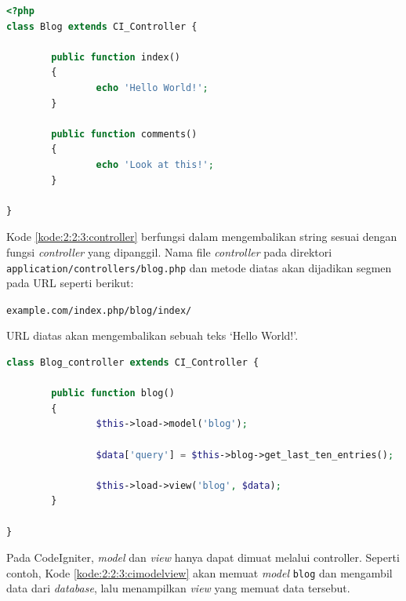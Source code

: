 \documentclass[a4paper,twoside]{article}
\begin{document}
\begin{enumerate}
\begin{itemize}
\begin{enumerate}
			                  \begin{lstlisting}[language=php, caption={Contoh \textit{controller}}, label={kode:2:2:3:controller}]
<?php
class Blog extends CI_Controller {

		public function index()
		{
				echo 'Hello World!';
		}

		public function comments()
		{
				echo 'Look at this!';
		}

}
\end{lstlisting}

			                  Kode \ref{kode:2:2:3:controller} berfungsi dalam mengembalikan string sesuai dengan fungsi \textit{controller} yang dipanggil. Nama file \textit{controller} pada direktori \verb|application/controllers/blog.php| dan metode diatas akan dijadikan segmen pada URL seperti berikut:

			                  \vspace{0.25cm}
			                  \begin{center}
				                  \verb|example.com/index.php/blog/index/|
			                  \end{center}
			                  \vspace{0.25cm}

			                  URL diatas akan mengembalikan sebuah teks `Hello World!'.

			                  \begin{lstlisting}[language=php, caption=Contoh memuat \textit{model} dan menampilkan \textit{view}, label=kode:2:2:3:cimodelview]
class Blog_controller extends CI_Controller {

		public function blog()
		{
				$this->load->model('blog');

				$data['query'] = $this->blog->get_last_ten_entries();

				$this->load->view('blog', $data);
		}

}
					\end{lstlisting}

			                  Pada CodeIgniter, \textit{model} dan \textit{view} hanya dapat dimuat melalui controller. Seperti contoh, Kode \ref{kode:2:2:3:cimodelview} akan memuat \textit{model} \verb|blog| dan mengambil data dari \textit{database}, lalu menampilkan \textit{view} yang memuat data tersebut.

		            \end{enumerate}

		            \newpage


\end{itemize}
\end{enumerate}
\end{document}
